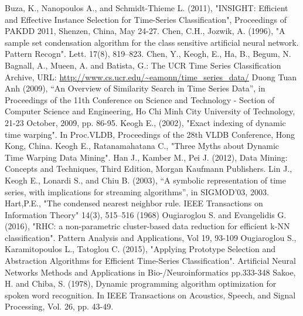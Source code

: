 \documentclass[13pt,oneside]{scrbook}
\begin{document}
\begin{spacing}{1.0}
\begin{thebibliography}{99}
\label{Buza}
Buza, K., Nanopoulos A., and Schmidt-Thieme L. (2011), 
"INSIGHT: Efficient and Effective Instance Selection for Time-Series  Classification", Proceedings of PAKDD 2011, Shenzen, China, May 24-27.
\label{CJA}Chen, C.H., Jozwik, A. (1996), "A sample set condensation algorithm for the class sensitive artificial neural network. Pattern Recogn". Lett. 17(8), 819–823.
\label{UCR}Chen, Y., Keogh, E., Ha, B., Begum, N. Bagnall, A., Mueen, A. and Batista, G.: The UCR Time Series Classification Archive, URL: \url{http://www.cs.ucr.edu/~eamonn/time_series_data/}
\label{Duong Tuan Anh}
Duong Tuan Anh (2009), “An Overview of Similarity Search in Time Series Data”, in Proceedings of the 11th Conference on Science and Technology -  Section of Computer Science and Engineering, Ho Chi Minh City University of Technology, 21-23 October, 2009, pp. 86-95.
\label{E.keogh}  Keogh E., (2002), 
"Exact indexing of dynamic time warping". In Proc.VLDB, Proceedings of the 28th VLDB Conference, Hong Kong, China.
\label{E.keogh2}  Keogh E., Ratanamahatana C.,
"Three Myths about Dynamic Time Warping Data Mining".
\label{Concepts and Techniques} Han J., Kamber M., Pei J. (2012),
Data Mining: Concepts and Techniques, Third Edition, Morgan Kaufmann Publishers.
\label{J. Lin}Lin J., Keogh E., Lonardi S., and Chiu B. (2003), 
“A symbolic representation of time series, with implications for streaming algorithms”, in SIGMOD’03, 2003.
\label{Hart}Hart,P.E., "The condensed nearest neighbor rule. IEEE Transactions on Information Theory" 14(3), 515–516 (1968)
\label{Stefanos Ougiaroglou}  Ougiaroglou S. and Evangelidis G. (2016), 
"RHC: a non-parametric cluster-based data reduction for efficient k-NN classification". Pattern Analysis and Applications, Vol 19, 93-109
\label{Stefanos Ougiaroglou Prototype} Ougiaroglou S., Karamitopoulos L., Tatoglou C. (2015),
"Applying Prototype Selection and Abstraction Algorithms for Efficient Time-Series
Classification". Artificial Neural Networks Methods and Applications in Bio-/Neuroinformatics pp.333-348
\label{SakoeChiba}Sakoe, H. and Chiba, S. (1978), Dynamic programming algorithm optimization for spoken word recognition. In IEEE Transactions on Acoustics, Speech, and Signal Processing, Vol. 26, pp. 43-49.

\end{thebibliography}
\end{spacing}
\end{document}
